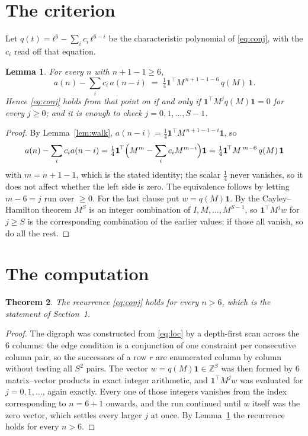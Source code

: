 \documentclass[11pt,a4paper]{article}
\theoremstyle{plain}
\newtheorem{theorem}{Theorem}
\newtheorem{lemma}[theorem]{Lemma}
\theoremstyle{definition}
\begin{document}
\section{The criterion}

Let $q(t)=t^{6}-\sum_i c_i\,t^{6-i}$ be the characteristic polynomial of
\eqref{eq:conj}, with the $c_i$ read off that equation.

\begin{lemma}\label{lem:crit}
For every $n$ with $n+1-1\ge6$,
\[
a(n)-\sum_i c_i\,a(n-i)\;=\;\tfrac1{4}\mathbf{1}^{\!\top}M^{\,n+1-1-6}\,q(M)\,\mathbf{1} .
\]
Hence \eqref{eq:conj} holds from that point on if and only if
$\mathbf{1}^{\!\top}M^{j}q(M)\mathbf{1}=0$ for every $j\ge0$; and it is enough to check
$j=0,1,\dots,S-1$.
\end{lemma}

\begin{proof}
By Lemma~\ref{lem:walk}, $a(n-i)=\tfrac1{4}\mathbf{1}^{\!\top}M^{\,n+1-1-i}\mathbf{1}$, so
\[
a(n)-\sum_i c_i a(n-i)
=\tfrac1{4}\mathbf{1}^{\!\top}\Bigl(M^{m}-\sum_i c_i M^{m-i}\Bigr)\mathbf{1}
=\tfrac1{4}\mathbf{1}^{\!\top}M^{\,m-6}\,q(M)\,\mathbf{1}
\]
with $m=n+1-1$, which is the stated identity; the scalar $\tfrac1{4}$ never vanishes, so
it does not affect whether the left side is zero. The equivalence follows by letting
$m-6=j$ run over $\ge0$. For the last clause put $w=q(M)\mathbf{1}$. By the
Cayley--Hamilton theorem $M^{S}$ is an integer combination of $I,M,\dots,M^{S-1}$, so
$\mathbf{1}^{\!\top}M^{j}w$ for $j\ge S$ is the corresponding combination of the earlier
values; if those all vanish, so do all the rest.
\end{proof}

\section{The computation}

\begin{theorem}
The recurrence \eqref{eq:conj} holds for every $n>6$, which is the statement of
Section~1.
\end{theorem}

\begin{proof}
The digraph was constructed from \eqref{eq:loc} by a depth-first scan across the $6$
columns: the edge condition is a conjunction of one constraint per consecutive column
pair, so the successors of a row $r$ are enumerated column by column without testing all
$S^2$ pairs. The vector $w=q(M)\mathbf{1}\in\mathbb{Z}^{S}$ was then formed by $6$
matrix--vector products in exact integer arithmetic, and $\mathbf{1}^{\!\top}M^{j}w$ was
evaluated for $j=0,1,\dots$, again exactly. Every one of those integers vanishes from the
index corresponding to $n=6+1$ onwards, and the run continued until $w$ itself was the
zero vector, which settles every larger $j$ at once. By Lemma~\ref{lem:crit} the recurrence
holds for every $n>6$.
\end{proof}
\end{document}
